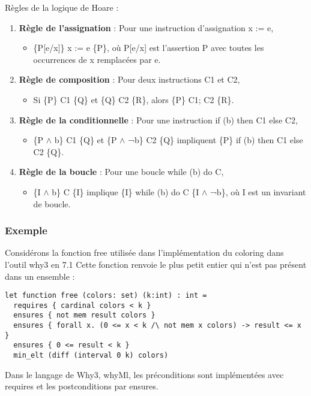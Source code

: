 \documentclass[11pt]{article}
\begin{document}
Règles  de la logique de Hoare : 
\begin{enumerate}
\item \textbf{\textbf{Règle de l'assignation}} : Pour une instruction d'assignation x := e,
\begin{itemize}
\item \{P[e/x]\} x := e \{P\}, où P[e/x] est l'assertion P avec toutes les occurrences de x remplacées par e.
\end{itemize}

\item \textbf{\textbf{Règle de composition}} : Pour deux instructions C1 et C2,
\begin{itemize}
\item Si \{P\} C1 \{Q\} et \{Q\} C2 \{R\}, alors \{P\} C1; C2 \{R\}.
\end{itemize}

\item \textbf{\textbf{Règle de la conditionnelle}} : Pour une instruction if (b) then C1 else C2,
\begin{itemize}
\item \{P \(\wedge\) b\} C1 \{Q\} et \{P \(\wedge\) ¬b\} C2 \{Q\} impliquent \{P\} if (b) then C1 else C2 \{Q\}.
\end{itemize}

\item \textbf{\textbf{Règle de la boucle}} : Pour une boucle while (b) do C,
\begin{itemize}
\item \{I \(\wedge\) b\} C \{I\} implique \{I\} while (b) do C \{I \(\wedge\) ¬b\}, où I est un invariant de boucle.
\end{itemize}
\end{enumerate}


\subsubsection{Exemple}
\label{sec:org2772392}
Considérons la fonction free utilisée dans l'implémentation du coloring dans l'outil why3 en 7.1
Cette fonction renvoie le plus petit entier qui n'est pas présent dans un ensemble :

\lstset{language=why3,label= ,caption= ,captionpos=b,numbers=none}
\begin{lstlisting}
let function free (colors: set) (k:int) : int =
  requires { cardinal colors < k }
  ensures { not mem result colors }
  ensures { forall x. (0 <= x < k /\ not mem x colors) -> result <= x }
  ensures { 0 <= result < k }
  min_elt (diff (interval 0 k) colors)
\end{lstlisting}
Dans le langage de Why3, whyMl, les préconditions sont implémentées avec requires 
et les postconditions par ensures.
\end{document}
